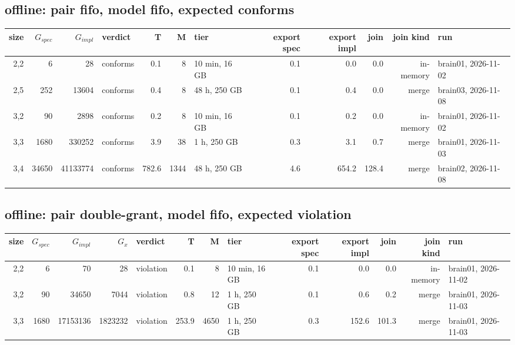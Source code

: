 \documentclass[10pt]{article}
\begin{document}
\subsection*{offline: pair \textsf{fifo}, model fifo, expected conforms}
\begin{longtable}{@{}rrrlrrlrrrrl@{}}
\toprule
size & $G_{\mathit{spec}}$ & $G_{\mathit{impl}}$ & verdict & T & M & tier & export spec & export impl & join & join kind & run \\
\midrule
\endhead
\color{red} 2,2 & 6 & 28 & conforms & 0.1 & 8 & 10 min, 16 GB & 0.1 & 0.0 & 0.0 & in-memory & brain01, 2026-11-02 \\
\color{blue} 2,5 & 252 & 13604 & conforms & 0.4 & 8 & 48 h, 250 GB & 0.1 & 0.4 & 0.0 & merge & brain03, 2026-11-08 \\
\color{red} 3,2 & 90 & 2898 & conforms & 0.2 & 8 & 10 min, 16 GB & 0.1 & 0.2 & 0.0 & in-memory & brain01, 2026-11-02 \\
\color{blue} 3,3 & 1680 & 330252 & conforms & 3.9 & 38 & 1 h, 250 GB & 0.3 & 3.1 & 0.7 & merge & brain01, 2026-11-03 \\
\color{blue} 3,4 & 34650 & 41133774 & conforms & 782.6 & 1344 & 48 h, 250 GB & 4.6 & 654.2 & 128.4 & merge & brain02, 2026-11-08 \\
\bottomrule
\end{longtable}
\subsection*{offline: pair \textsf{double-grant}, model fifo, expected violation}
\begin{longtable}{@{}rrrrlrrlrrrrl@{}}
\toprule
size & $G_{\mathit{spec}}$ & $G_{\mathit{impl}}$ & $G_x$ & verdict & T & M & tier & export spec & export impl & join & join kind & run \\
\midrule
\endhead
\color{red} 2,2 & 6 & 70 & 28 & violation & 0.1 & 8 & 10 min, 16 GB & 0.1 & 0.0 & 0.0 & in-memory & brain01, 2026-11-02 \\
\color{blue} 3,2 & 90 & 34650 & 7044 & violation & 0.8 & 12 & 1 h, 250 GB & 0.1 & 0.6 & 0.2 & merge & brain01, 2026-11-03 \\
\color{blue} 3,3 & 1680 & 17153136 & 1823232 & violation & 253.9 & 4650 & 1 h, 250 GB & 0.3 & 152.6 & 101.3 & merge & brain01, 2026-11-03 \\
\bottomrule
\end{longtable}
\end{document}
